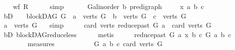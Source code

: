 \begin{isabellebody}
\ \ \isamarkupfalse%
\ {\isachardoublequoteopen}wf\ {\isacharquery}{\kern0pt}R{\isachardoublequoteclose}\isanewline
\ \ \ \ \isamarkupfalse%
\ simp\ \isanewline
{}\isamarkupfalse%
\ \isanewline
\ \ \isamarkupfalse%
\ G{\isacharcolon}{\kern0pt}{\isacharcolon}{\kern0pt}{\isachardoublequoteopen}{\isacharparenleft}{\kern0pt}{\isacharprime}{\kern0pt}a{\isacharcolon}{\kern0pt}{\isacharcolon}{\kern0pt}linorder{\isacharcomma}{\kern0pt}\ {\isacharprime}{\kern0pt}b{\isacharparenright}{\kern0pt}\ pre{\isacharunderscore}{\kern0pt}digraph{\isachardoublequoteclose}\ \isanewline
\ \ \isamarkupfalse%
\ x\ a\ b\ c\isanewline
\ \ \isamarkupfalse%
\ bD{\isacharcolon}{\kern0pt}\ {\isachardoublequoteopen}\ {\isasymnot}\ {\isacharparenleft}{\kern0pt}{\isasymnot}\ blockDAG\ G\ {\isasymor}\ a\ {\isasymnotin}\ verts\ G\ {\isasymor}\ b\ {\isasymnotin}\ verts\ G\ {\isasymor}\ c\ {\isasymnotin}\ verts\ G{\isacharparenright}{\kern0pt}{\isachardoublequoteclose}\isanewline
\ \ \isamarkupfalse%
\ \isamarkupfalse%
\ {\isachardoublequoteopen}a\ {\isasymin}\ verts\ G{\isachardoublequoteclose}\ \ \isamarkupfalse%
\ simp\isanewline
\ \ \isamarkupfalse%
\ \isamarkupfalse%
\ {\isachardoublequoteopen}card\ {\isacharparenleft}{\kern0pt}verts\ {\isacharparenleft}{\kern0pt}reduce{\isacharunderscore}{\kern0pt}past\ G\ a{\isacharparenright}{\kern0pt}{\isacharparenright}{\kern0pt}\ {\isacharless}{\kern0pt}\ card\ {\isacharparenleft}{\kern0pt}verts\ G{\isacharparenright}{\kern0pt}{\isachardoublequoteclose}\ \ \ \isanewline
\ \ \ \ \isamarkupfalse%
\ bD\ blockDAG{\isachardot}{\kern0pt}reduce{\isacharunderscore}{\kern0pt}less\isanewline
\ \ \ \ \isamarkupfalse%
\ metis\isanewline
\ \ \isamarkupfalse%
\ \isamarkupfalse%
\ {\isachardoublequoteopen}{\isacharparenleft}{\kern0pt}{\isacharparenleft}{\kern0pt}reduce{\isacharunderscore}{\kern0pt}past\ G\ a{\isacharcomma}{\kern0pt}\ x{\isacharcomma}{\kern0pt}\ b{\isacharcomma}{\kern0pt}\ c{\isacharparenright}{\kern0pt}{\isacharcomma}{\kern0pt}\ G{\isacharcomma}{\kern0pt}\ a{\isacharcomma}{\kern0pt}\ b{\isacharcomma}{\kern0pt}\ c{\isacharparenright}{\kern0pt}\isanewline
\ \ \ \ \ \ \ {\isasymin}\ measures\isanewline
\ \ \ \ \ \ \ \ \ \ \ {\isacharbrackleft}{\kern0pt}{\isasymlambda}{\isacharparenleft}{\kern0pt}G{\isacharcomma}{\kern0pt}\ a{\isacharcomma}{\kern0pt}\ b{\isacharcomma}{\kern0pt}\ c{\isacharparenright}{\kern0pt}{\isachardot}{\kern0pt}\ card\ {\isacharparenleft}{\kern0pt}verts\ G{\isacharparenright}{\kern0pt}{\isacharcomma}{\kern0pt}\ \ \isanewline

\end{isabellebody}
